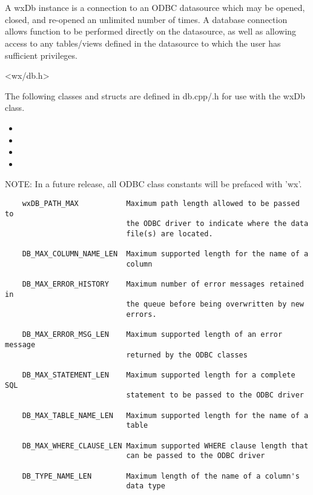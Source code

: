 \section{}\label{wxdb}

A wxDb instance is a connection to an ODBC datasource which may
be opened, closed, and re-opened an unlimited number of times.  A
database connection allows function to be performed directly on the
datasource, as well as allowing access to any tables/views defined in
the datasource to which the user has sufficient privileges.


<wx/db.h>


The following classes and structs are defined in db.cpp/.h for use with the wxDb class.

\begin{itemize}\itemsep=0pt
\item {}
\item {}
\item {}
\item {}
\end{itemize}


NOTE: In a future release, all ODBC class constants will be prefaced with 'wx'.

\begin{verbatim}
    wxDB_PATH_MAX           Maximum path length allowed to be passed to
                            the ODBC driver to indicate where the data 
                            file(s) are located.

    DB_MAX_COLUMN_NAME_LEN  Maximum supported length for the name of a 
                            column

    DB_MAX_ERROR_HISTORY    Maximum number of error messages retained in 
                            the queue before being overwritten by new 
                            errors.

    DB_MAX_ERROR_MSG_LEN    Maximum supported length of an error message 
                            returned by the ODBC classes

    DB_MAX_STATEMENT_LEN    Maximum supported length for a complete SQL 
                            statement to be passed to the ODBC driver

    DB_MAX_TABLE_NAME_LEN   Maximum supported length for the name of a 
                            table

    DB_MAX_WHERE_CLAUSE_LEN Maximum supported WHERE clause length that 
                            can be passed to the ODBC driver

    DB_TYPE_NAME_LEN        Maximum length of the name of a column's 
                            data type
\end{verbatim}

